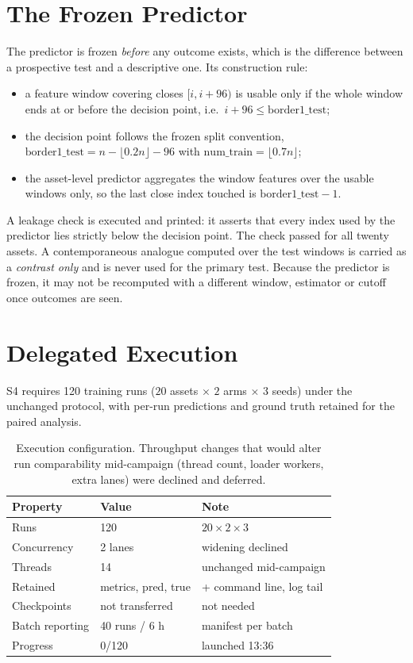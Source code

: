 \documentclass[conference]{IEEEtran}
\begin{document}
\section{The Frozen Predictor}
\label{sec:pred}

The predictor is frozen \emph{before} any outcome exists, which is the difference between a
prospective test and a descriptive one. Its construction rule:

\begin{itemize}
\item a feature window covering closes $[i, i+96)$ is usable only if the whole window ends at or
before the decision point, i.e.\ $i+96 \le \mathrm{border1\_test}$;
\item the decision point follows the frozen split convention,
$\mathrm{border1\_test} = n - \lfloor 0.2n \rfloor - 96$ with $\mathrm{num\_train} = \lfloor 0.7n
\rfloor$;
\item the asset-level predictor aggregates the window features over the usable windows only, so the
last close index touched is $\mathrm{border1\_test} - 1$.
\end{itemize}

A leakage check is executed and printed: it asserts that every index used by the predictor lies
strictly below the decision point. The check passed for all twenty assets. A contemporaneous
analogue computed over the test windows is carried as a \emph{contrast only} and is never used for
the primary test. Because the predictor is frozen, it may not be recomputed with a different window,
estimator or cutoff once outcomes are seen.

\section{Delegated Execution}
\label{sec:exec}

S4 requires 120 training runs ($20$ assets $\times$ $2$ arms $\times$ $3$ seeds) under the unchanged
protocol, with per-run predictions and ground truth retained for the paired analysis.
\begin{table}[!t]
\centering
\footnotesize
\setlength{\tabcolsep}{3pt}
\begin{tabular}{@{}p{}p{}p{}@{}}
\toprule
Property & Value & Note \\
\midrule
Runs & 120 & $20 \times 2 \times 3$ \\
Concurrency & 2 lanes & widening declined \\
Threads & 14 & unchanged mid-campaign \\
Retained & metrics, pred, true & + command line, log tail \\
Checkpoints & not transferred & not needed \\
Batch reporting & 40 runs / 6 h & manifest per batch \\
Progress & 0/120 & launched 13:36 \\
\bottomrule
\end{tabular}
\caption{Execution configuration. Throughput changes that would alter run comparability mid-campaign
(thread count, loader workers, extra lanes) were declined and deferred.}
\label{tab:exec}
\end{table}
\end{document}
